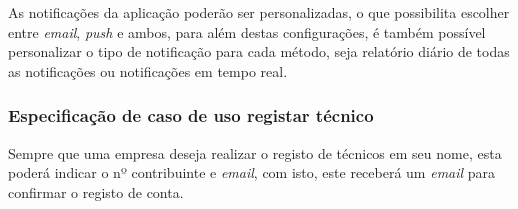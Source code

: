 As notificações da aplicação poderão ser personalizadas, o que possibilita escolher entre \textit{email}, \textit{push} e ambos,
para além destas configurações, é também possível personalizar o tipo de notificação para cada método, seja relatório diário de todas as notificações ou notificações em tempo real.



\subsubsection{Especificação de caso de uso registar técnico}

Sempre que uma empresa deseja realizar o registo de técnicos em seu nome, esta poderá indicar o nº contribuinte e \textit{email}, com isto, este receberá um \textit{email} para confirmar o registo de conta.






% 




% 



